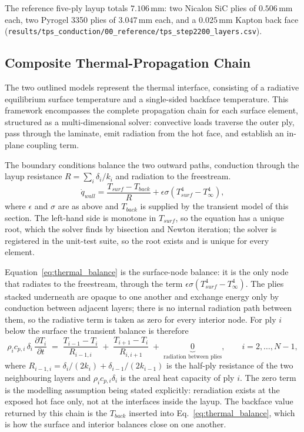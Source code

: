 \noindent The reference five-ply layup totals $7.106$\,mm: two Nicalon SiC plies of $0.506$\,mm each, two Pyrogel 3350 plies of $3.047$\,mm each, and a $0.025$\,mm Kapton back face (\texttt{results/tps\_conduction/00\_reference/tps\_step2200\_layers.csv}).

\subsection{Composite Thermal-Propagation Chain}
\label{sec:thermal_chain}

The two outlined models represent the thermal interface, consisting of a radiative equilibrium surface temperature and a single-sided backface temperature. This framework encompasses the complete propagation chain for each surface element, structured as a multi-dimensional solver: convective loads traverse the outer ply, pass through the laminate, emit radiation from the hot face, and establish an in-plane coupling term.

The boundary conditions balance the two outward paths, conduction through the layup resistance $R=\sum_i \delta_i/k_i$ and radiation to the freestream.
\begin{equation}
    \dot{q}_{wall} = \frac{T_{surf}-T_{back}}{R} + \epsilon\sigma\left(T_{surf}^{4}-T_{\infty}^{4}\right),
    \label{eq:thermal_balance}
\end{equation}
where $\epsilon$ and $\sigma$ are as above and $T_{back}$ is supplied by the transient model of this section. The left-hand side is monotone in $T_{surf}$, so the equation has a unique root, which the solver finds by bisection and Newton iteration; the solver is registered in the unit-test suite, so the root exists and is unique for every element.

Equation~\eqref{eq:thermal_balance} is the surface-node balance: it is the only node that radiates to the freestream, through the term $\epsilon\sigma(T_{surf}^4-T_\infty^4)$. The plies stacked underneath are opaque to one another and exchange energy only by conduction between adjacent layers; there is no internal radiation path between them, so the radiative term is taken as zero for every interior node. For ply $i$ below the surface the transient balance is therefore
\begin{equation}
    \rho_i c_{p,i}\,\delta_i\,\frac{\partial T_i}{\partial t}
    \;=\;
    \frac{T_{i-1}-T_i}{R_{i-1,i}}
    \;+\;
    \frac{T_{i+1}-T_i}{R_{i,i+1}}
    \;+\;
    \underbrace{0}_{\text{radiation between plies}},
    \qquad i = 2,\dots,N-1,
    \label{eq:ply_balance}
\end{equation}
where $R_{i-1,i}=\delta_i/(2k_i)+\delta_{i-1}/(2k_{i-1})$ is the half-ply resistance of the two neighbouring layers and $\rho_i c_{p,i}\delta_i$ is the areal heat capacity of ply $i$. The zero term is the modelling assumption being stated explicitly: reradiation exists at the exposed hot face only, not at the interfaces inside the layup. The backface value returned by this chain is the $T_{back}$ inserted into Eq.~\eqref{eq:thermal_balance}, which is how the surface and interior balances close on one another.

